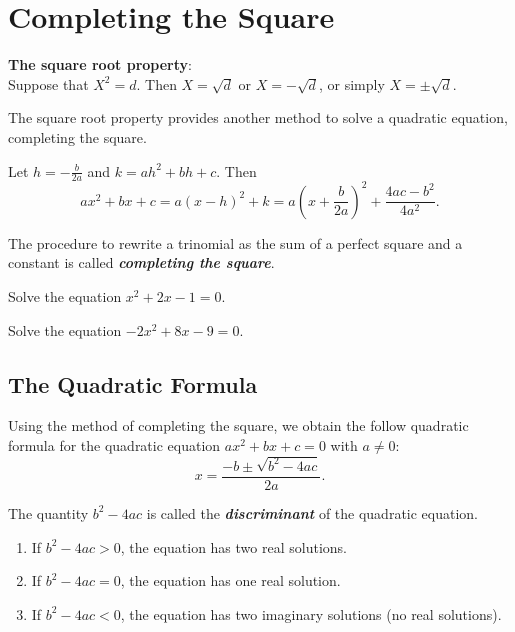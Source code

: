 
\hypertarget{completing-the-square}{%
\section{Completing the Square}\label{completing-the-square}}

\textbf{The square root property}:\\
Suppose that \(X^2=d\). Then \(X=\sqrt{d}\) or \(X=-\sqrt{d}\), or
simply \(X=\pm\sqrt{d}\).

The square root property provides another method to solve a quadratic
equation, completing the square. 

Let \(h=-\frac{b}{2a}\) and  \(k=ah^2+bh+c\).
Then \[
ax^2+bx+c=a(x-h)^2+k=a\left(x+\frac{b}{2a}\right)^2+\frac{4ac-b^2}{4a^2}.
\]

The procedure to rewrite a trinomial as the sum of a perfect square and
a constant is called \textbf{\emph{completing the square}}.

\begin{example}

Solve the equation \(x^2+2x-1=0\).

\end{example}
\vspace*{5\baselineskip}

\begin{example}

Solve the equation \(-2x^2+8x-9=0\).

\end{example}
\vspace*{5\baselineskip}

\hypertarget{the-quadratic-formula}{%
\subsection{The Quadratic Formula}\label{the-quadratic-formula}}

Using the method of completing the square, we obtain the follow
quadratic formula for the quadratic equation \(ax^2+bx+c=0\) with
\(a\neq 0\): \[
    x=\frac{-b\pm\sqrt{b^2-4ac}}{2a}.
\]

The quantity \(b^2-4ac\) is called the \textbf{\emph{discriminant}} of
the quadratic equation.

\begin{enumerate}[sepno]
\item
  If \(b^2-4ac>0\), the equation has two real solutions.
\item
  If \(b^2-4ac=0\), the equation has one real solution.
\item
  If \(b^2-4ac<0\), the equation has two imaginary solutions (no real
  solutions).
\end{enumerate}

